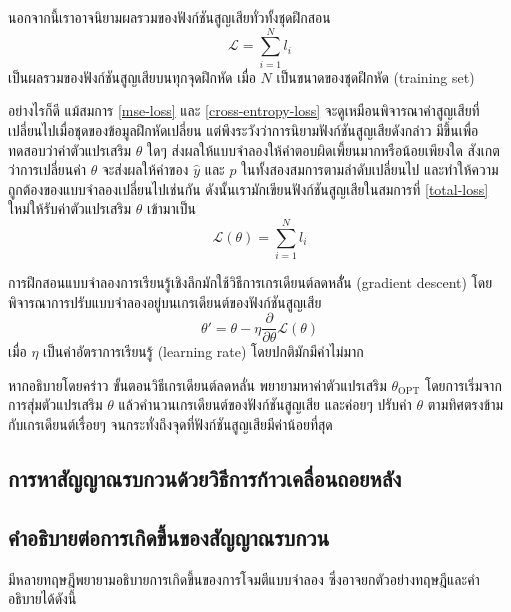 \documentclass{cpepaper}
\begin{document}
นอกจากนี้เราอาจนิยามผลรวมของฟังก์ชันสูญเสียทั่วทั้งชุดฝึกสอน
\begin{equation}
    \mathcal{L} = \sum_{i=1}^{N}{l_i}
    \label{total-loss}
\end{equation}
เป็นผลรวมของฟังก์ชันสูญเสียบนทุกจุดฝึกหัด เมื่อ $N$ เป็นขนาดของชุดฝึกหัด (training set)

อย่างไรก็ดี แม้สมการ \ref{mse-loss} และ \ref{cross-entropy-loss} จะดูเหมือนพิจารณาค่าสูญเสียที่เปลี่ยนไปเมื่อชุดของข้อมูลฝึกหัดเปลี่ยน แต่พึงระวังว่าการนิยามฟังก์ชันสูญเสียดังกล่าว มีขึ้นเพื่อทดสอบว่าค่าตัวแปรเสริม $\theta$ ใดๆ ส่งผลให้แบบจำลองให้คำตอบผิดเพี้ยนมากหรือน้อยเพียงใด สังเกตว่าการเปลี่ยนค่า $\theta$ จะส่งผลให้ค่าของ $\hat{y}$ และ $p$ ในทั้งสองสมการตามลำดับเปลี่ยนไป และทำให้ความถูกต้องของแบบจำลองเปลี่ยนไปเช่นกัน ดังนั้นเรามักเขียนฟังก์ชันสูญเสียในสมการที่ \ref{total-loss} ใหม่ให้รับค่าตัวแปรเสริม $\theta$ เข้ามาเป็น
\begin{equation}
    \mathcal{L}(\theta) = \sum_{i=1}^{N}{l_i}
    \label{total-loss-theta}
\end{equation}

การฝึกสอนแบบจำลองการเรียนรู้เชิงลึกมักใช้วิธีการเกรเดียนต์ลดหลัั่น (gradient descent) โดยพิจารณาการปรับแบบจำลองอยู่บนเกรเดียนต์ของฟังก์ชันสูญเสีย
\begin{equation}
    \theta' = \theta - \eta \frac{\partial}{\partial \theta}{\mathcal{L}(\theta)}
    \label{gradient-descent}
\end{equation}
เมื่อ $\eta$ เป็นค่าอัตราการเรียนรู้ (learning rate) โดยปกติมักมีค่าไม่มาก

หากอธิบายโดยคร่าว ขั้นตอนวิธีเกรเดียนต์ลดหลั่น พยายามหาค่าตัวแปรเสริม $\theta_{\textrm{OPT}}$ โดยการเริ่มจากการสุ่มตัวแปรเสริม $\theta$ แล้วคำนวนเกรเดียนต์ของฟังก์ชันสูญเสีย และค่อยๆ ปรับค่า $\theta$ ตามทิศตรงข้ามกับเกรเดียนต์เรื่อยๆ จนกระทั่งถึงจุดที่ฟังก์ชันสูญเสียมีค่าน้อยที่สุด

\subsection{การหาสัญญาณรบกวนด้วยวิธีการก้าวเคลื่อนถอยหลัง}

\subsection{คำอธิบายต่อการเกิดขึ้นของสัญญาณรบกวน}

มีหลายทฤษฎีพยายามอธิบายการเกิดขึ้นของการโจมตีแบบจำลอง ซึ่งอาจยกตัวอย่างทฤษฎีและคำอธิบายได้ดังนี้
\end{document}
